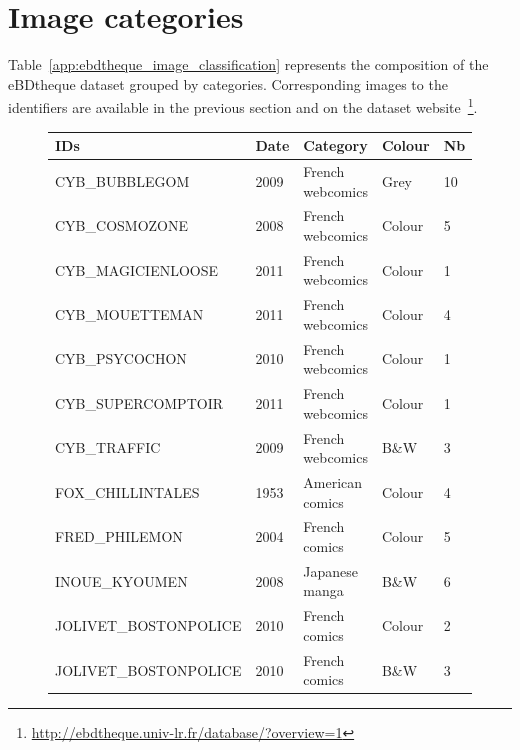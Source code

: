 
\section{Image categories}

Table~\ref{app:ebdtheque_image_classification} represents the composition of the eBDtheque dataset grouped by categories. 
Corresponding images to the identifiers are available in the previous section and on the dataset website~\footnote{\url{http://ebdtheque.univ-lr.fr/database/?overview=1}}.


\begin{figure}[!ht]
	\begin{center}
	\begin{tabular}{|lllll|}
	\hline
	\textbf{IDs}                              & \textbf{Date} & \textbf{Category}         & \textbf{Colour}     & \textbf{Nb} \\
	\hline
	CYB\_BUBBLEGOM                         & 2009        & French webcomics & Grey & 10       \\
	CYB\_COSMOZONE                         & 2008        & French webcomics & Colour     & 5        \\
	CYB\_MAGICIENLOOSE                     & 2011        & French webcomics & Colour     & 1        \\
	CYB\_MOUETTEMAN                        & 2011        & French webcomics & Colour     & 4        \\
	CYB\_PSYCOCHON                         & 2010        & French webcomics & Colour     & 1        \\
	CYB\_SUPERCOMPTOIR                     & 2011        & French webcomics & Colour     & 1        \\
	CYB\_TRAFFIC                           & 2009        & French webcomics & B\&W       & 3        \\
	FOX\_CHILLINTALES                      & 1953        & American comics  & Colour     & 4        \\
	FRED\_PHILEMON                         & 2004        & French comics    & Colour     & 5        \\
	INOUE\_KYOUMEN                         & 2008        & Japanese manga   & B\&W       & 6        \\
	JOLIVET\_BOSTONPOLICE      & 2010        & French comics    & Colour     & 2        \\
	JOLIVET\_BOSTONPOLICE      & 2010        & French comics    & B\&W       & 3        \\

\end{tabular}
\end{center}
\end{figure}
